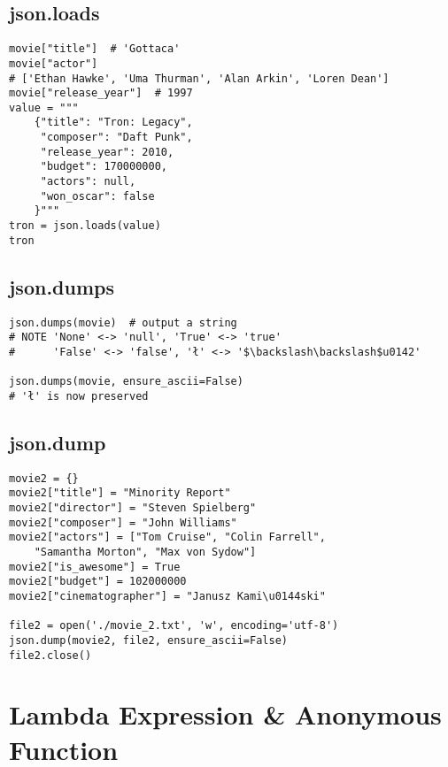 \documentclass{beamer}
\begin{document}
\subsection{json.loads}

\begin{frame}[fragile]
\begin{verbatim}
movie["title"]  # 'Gottaca'
movie["actor"]
# ['Ethan Hawke', 'Uma Thurman', 'Alan Arkin', 'Loren Dean']
movie["release_year"]  # 1997
value = """
    {"title": "Tron: Legacy",
     "composer": "Daft Punk",
     "release_year": 2010,
     "budget": 170000000,
     "actors": null,
     "won_oscar": false
    }"""
tron = json.loads(value)
tron
\end{verbatim}
\end{frame}

\subsection{json.dumps}

\begin{frame}[fragile]
\begin{verbatim}
json.dumps(movie)  # output a string
# NOTE 'None' <-> 'null', 'True' <-> 'true'
#      'False' <-> 'false', 'ł' <-> '$\backslash\backslash$u0142'

json.dumps(movie, ensure_ascii=False)
# 'ł' is now preserved
\end{verbatim}
\end{frame}

\subsection{json.dump}

\begin{frame}[fragile]
\begin{verbatim}
movie2 = {}
movie2["title"] = "Minority Report"
movie2["director"] = "Steven Spielberg"
movie2["composer"] = "John Williams"
movie2["actors"] = ["Tom Cruise", "Colin Farrell", 
    "Samantha Morton", "Max von Sydow"]
movie2["is_awesome"] = True
movie2["budget"] = 102000000
movie2["cinematographer"] = "Janusz Kami\u0144ski"

file2 = open('./movie_2.txt', 'w', encoding='utf-8')
json.dump(movie2, file2, ensure_ascii=False)
file2.close()
\end{verbatim}
\end{frame}

\section{Lambda Expression \& Anonymous Function}
\end{document}
